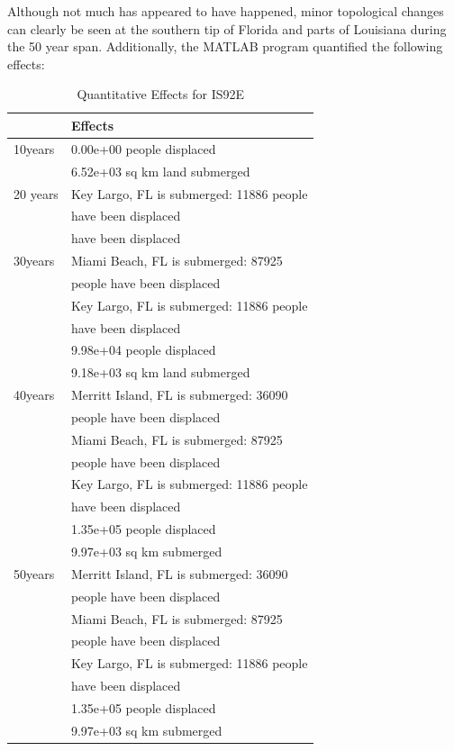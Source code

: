 \documentclass[12pt,a4paper,titlepage]{article}
\begin{document}
Although not much has appeared to have happened, minor topological
changes can clearly be seen at the southern tip of Florida and
parts of Louisiana during the 50 year span. Additionally, the
MATLAB program quantified the following effects:

\begin{table}[!htb]
\centering \caption{Quantitative Effects for IS92E}
\begin{tabular}{|l|l|}
\hline
 & Effects \\
\hline
10years & 0.00e+00 people displaced \\
\hline
 & 6.52e+03 sq km land submerged \\
\cline{2-2}
20 years & Key Largo, FL is submerged: 11886 people \\
 & have been displaced \\
\cline{2-2}
 & have been displaced \\
\hline
30years & Miami Beach, FL is submerged: 87925 \\
 & people have been displaced \\
 & Key Largo, FL is submerged: 11886 people \\
 & have been displaced \\
\hline
 & 9.98e+04 people displaced \\
 & 9.18e+03 sq km land submerged \\
\hline
40years & Merritt Island, FL is submerged: 36090 \\
 & people have been displaced \\
 & Miami Beach, FL is submerged: 87925 \\
 & people have been displaced \\
 & Key Largo, FL is submerged: 11886 people \\
 & have been displaced \\
\cline{2-2}
 & 1.35e+05 people displaced \\
 & 9.97e+03 sq km submerged \\
\hline
50years & Merritt Island, FL is submerged: 36090 \\
 & people have been displaced \\
 & Miami Beach, FL is submerged: 87925 \\
 & people have been displaced \\
 & Key Largo, FL is submerged: 11886 people \\
 & have been displaced \\
\cline{2-2}
 & 1.35e+05 people displaced \\
 & 9.97e+03 sq km submerged \\
\hline
\end{tabular}
\end{table}
\end{document}
